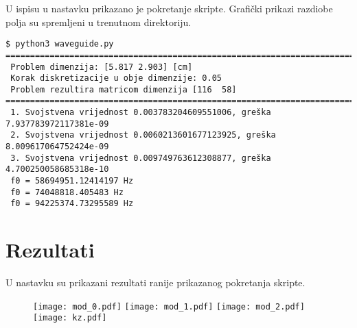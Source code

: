\documentclass{article}
\begin{document}
U ispisu u nastavku prikazano je pokretanje skripte. Grafički prikazi razdiobe
polja su spremljeni u trenutnom direktoriju.

\begin{verbatim}
$ python3 waveguide.py
=============================================================================
 Problem dimenzija: [5.817 2.903] [cm]
 Korak diskretizacije u obje dimenzije: 0.05
 Problem rezultira matricom dimenzija [116  58]
=============================================================================
 1. Svojstvena vrijednost 0.003783204609551006, greška 7.937783972117381e-09
 2. Svojstvena vrijednost 0.0060213601677123925, greška 8.009617064752424e-09
 3. Svojstvena vrijednost 0.009749763612308877, greška 4.700250058685318e-10
 f0 = 58694951.12414197 Hz
 f0 = 74048818.405483 Hz
 f0 = 94225374.73295589 Hz
\end{verbatim}

\section{Rezultati}

U nastavku su prikazani rezultati ranije prikazanog pokretanja skripte.

\begin{figure}[h]
    \texttt{[image: mod\_0.pdf]}
    \texttt{[image: mod\_1.pdf]}
    \texttt{[image: mod\_2.pdf]}
    \texttt{[image: kz.pdf]}
\end{figure}
\end{document}
